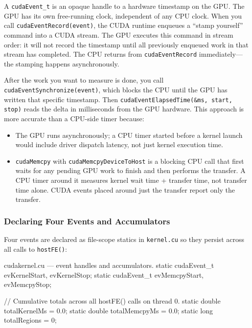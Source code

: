 \documentclass[
	english,
	letterpaper, oneside
]{article}
\begin{document}
A \texttt{cudaEvent\_t} is an opaque handle to a hardware timestamp on the
GPU. The GPU has its own free-running clock, independent of any CPU clock.
When you call \texttt{cudaEventRecord(event)}, the CUDA runtime enqueues a
``stamp yourself'' command into a CUDA stream. The GPU executes this
command in stream order: it will not record the timestamp until all
previously enqueued work in that stream has completed. The CPU returns from
\texttt{cudaEventRecord} immediately—the stamping happens asynchronously.

After the work you want to measure is done, you call
\texttt{cudaEventSynchronize(event)}, which blocks the CPU until the GPU
has written that specific timestamp. Then \texttt{cudaEventElapsedTime(\&ms,
start, stop)} reads the delta in milliseconds from the GPU hardware. This
approach is more accurate than a CPU-side timer because:

\begin{itemize}
    \item The GPU runs asynchronously; a CPU timer started before a kernel
    launch would include driver dispatch latency, not just kernel execution
    time.
    \item \texttt{cudaMemcpy} with \texttt{cudaMemcpyDeviceToHost} is a
    blocking CPU call that first waits for any pending GPU work to finish
    and then performs the transfer. A CPU timer around it measures
    kernel wait time + transfer time, not transfer time alone.
    CUDA events placed around just the transfer report only the transfer.
\end{itemize}

\subsubsection{Declaring Four Events and Accumulators}

Four events are declared as file-scope statics in \texttt{kernel.cu} so
they persist across all calls to \texttt{hostFE()}:

\begin{sourcecode}{cuda}{kernel.cu — event handles and accumulators.}
static cudaEvent_t evKernelStart, evKernelStop;
static cudaEvent_t evMemcpyStart,  evMemcpyStop;

// Cumulative totals across all hostFE() calls on thread 0.
static double totalKernelMs = 0.0;
static double totalMemcpyMs = 0.0;
static long   totalRegions  = 0;
\end{sourcecode}
\end{document}
